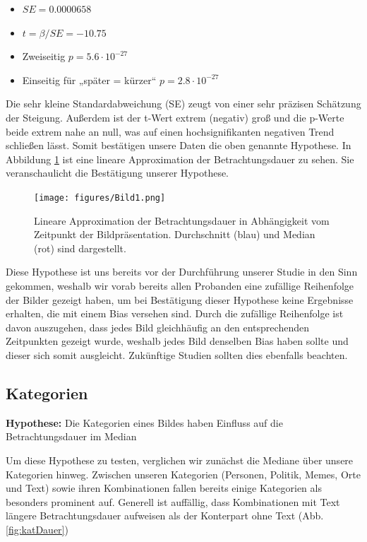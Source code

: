\documentclass[
    language=german, %
    thesis=seminar, %
    supervisor=postdoc, %
    multiauthor=true, %
    ]{settings/csssa-thesis}
\begin{document}
\begin{itemize}
  \item $SE = 0.0000658$
  \item $t = \beta / SE = -10.75$
  \item Zweiseitig $p = 5.6 \cdot 10^{-27}$
  \item Einseitig für „später = kürzer“ $p = 2.8 \cdot 10^{-27}$
\end{itemize}


Die sehr kleine Standardabweichung (SE) zeugt von einer sehr präzisen Schätzung der Steigung.  
Außerdem ist der t-Wert extrem (negativ) groß und die p-Werte beide extrem nahe an null,
was auf einen hochsignifikanten negativen Trend schließen lässt. Somit bestätigen unsere
Daten die oben genannte Hypothese. In Abbildung \ref{fig:lineareAppox} ist eine lineare Approximation der
Betrachtungsdauer zu sehen. Sie veranschaulicht die Bestätigung unserer Hypothese. 

\begin{figure}[h]
    \centering
    \texttt{[image: figures/Bild1.png]}
    \caption{Lineare Approximation der Betrachtungsdauer in Abhängigkeit vom Zeitpunkt der Bildpräsentation. Durchschnitt (blau) und Median (rot) sind dargestellt.}
    \label{fig:lineareAppox}
\end{figure}

Diese Hypothese ist uns bereits vor der Durchführung unserer Studie in den Sinn gekommen, 
weshalb wir vorab bereits allen Probanden eine zufällige Reihenfolge der Bilder gezeigt haben, 
um bei Bestätigung dieser Hypothese keine Ergebnisse erhalten, die mit einem Bias versehen sind. 
Durch die zufällige Reihenfolge ist davon auszugehen, dass jedes Bild gleichhäufig an den entsprechenden 
Zeitpunkten gezeigt wurde, weshalb jedes Bild denselben Bias haben sollte und dieser sich somit ausgleicht. 
Zukünftige Studien sollten dies ebenfalls beachten. 

\subsection{Kategorien}
\textbf{Hypothese:} Die Kategorien eines Bildes haben Einfluss auf die Betrachtungsdauer im Median 

Um diese Hypothese zu testen, verglichen wir zunächst die Mediane über unsere Kategorien hinweg. 
Zwischen unseren Kategorien (Personen, Politik, Memes, Orte und Text) sowie ihren Kombinationen 
fallen bereits einige Kategorien als besonders prominent auf. Generell ist auffällig, dass 
Kombinationen mit Text längere Betrachtungsdauer aufweisen als der Konterpart ohne Text (Abb. \ref{fig:katDauer}) 
\end{document}
